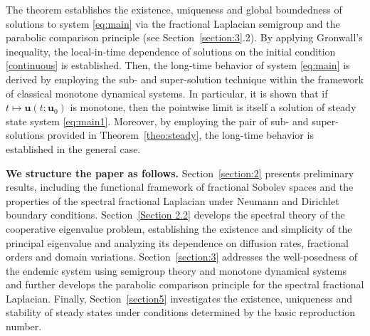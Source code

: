 \documentclass[a4paper,11pt]{amsart}
\theoremstyle{definition}
\numberwithin{equation}{section}
\theoremstyle{definition}
\begin{document}
The theorem establishes the existence, uniqueness and global boundedness of solutions to system \eqref{eq:main} via the fractional Laplacian semigroup and the parabolic comparison principle (see Section~\ref{section:3}.2). By applying Gronwall’s inequality, the local-in-time dependence of solutions on the initial condition \eqref{continuous} is established. Then, the long-time behavior of system \eqref{eq:main} is derived by employing the sub- and super-solution technique within the framework of classical monotone dynamical systems. In particular, it is shown that if $t \mapsto \mathbf{u}(t;\mathbf{u}_0)$ is monotone, then the pointwise limit is itself a solution of steady state system \eqref{eq:main1}. Moreover, by employing the pair of sub- and super-solutions provided in Theorem~\ref{theo:steady}, the long-time behavior is established in the general case.





\textbf{We structure the paper as follows.}
Section~\ref{section:2} presents preliminary results, including the functional framework of fractional Sobolev spaces and the properties of the spectral fractional Laplacian under Neumann and Dirichlet boundary conditions. Section~\ref{Section 2.2} develops the spectral theory of the cooperative eigenvalue problem, establishing the existence and simplicity of the principal eigenvalue and analyzing its dependence on diffusion rates, fractional orders and domain variations. Section~\ref{section:3} addresses the well-posedness of the endemic system using semigroup theory and monotone dynamical systems and further develops the parabolic comparison principle for the spectral fractional Laplacian. Finally, Section~\ref{section5} investigates the existence, uniqueness and stability of steady states under conditions determined by the basic reproduction number. 




\end{document}
